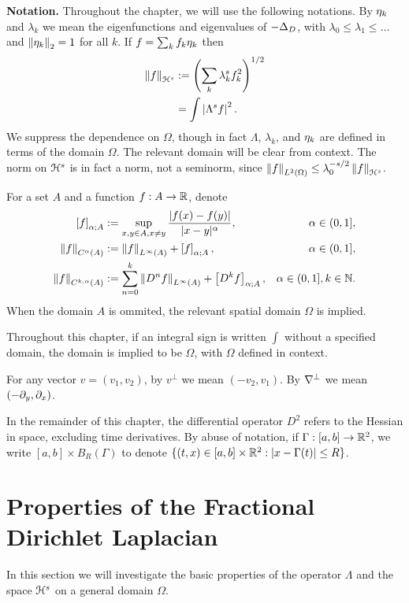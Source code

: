 \textbf{Notation.} Throughout the chapter, we will use the following notations.
By $\eta_{k}$ and $\lambda_k$ we mean the eigenfunctions and eigenvalues of $-\Delta_D$, with $\lambda_0 \leq \lambda_1 \leq \ldots$ and $\left\lVert\eta_{k}\right\rVert_2 = 1$ for all $k$.  
If $f = \sum_k f_k \eta_{k}$ then
\begin{align*} 
\left\lVert f\right\rVert_{\mathcal{H}^s} &:= \left( \sum_k \lambda_k^{s} f_k^2 \right)^{1/2} 
\\ &= \int \left\lvert \Lambda^{s} f \right\rvert^2. 
\end{align*}
We suppress the dependence on $\Omega$, though in fact $\Lambda$, $\lambda_k$, and $\eta_{k}$ are defined in terms of the domain $\Omega$.  The relevant domain will be clear from context.  The norm on $\mathcal{H}^s$ is in fact a norm, not a seminorm, since $\left\lVert f\right\rVert_{L^2(\Omega)} \leq \lambda_0^{-s/2} \left\lVert f\right\rVert_{\mathcal{H}^s}$.  

For a set $A$ and a function $f:A \to \mathbb{R}$, denote
\begin{align*}
\left[ f \right]_{\alpha;A} &:= \sup_{x,y \in A, x \neq y} \frac{|f(x)-f(y)|}{|x-y|^\alpha},  &\alpha \in (0,1], \\
\left\lVert f\right\rVert_{C^\alpha(A)} &:= \left\lVert f\right\rVert_{L^\infty(A)} + \left[ f \right]_{\alpha;A}, & \alpha \in (0,1], \\
\left\lVert f\right\rVert_{C^{k,\alpha}(A)} &:= \sum_{n=0}^k \left\lVert D^n f\right\rVert_{L^\infty(A)} + \left[ D^k f \right]_{\alpha;A}, & \alpha \in (0,1], k \in \mathbb{N}.
\end{align*}
When the domain $A$ is ommited, the relevant spatial domain $\Omega$ is implied.   

Throughout this chapter, if an integral sign is written $\int$ without a specified domain, the domain is implied to be $\Omega$, with $\Omega$ defined in context.  

For any vector $v = (v_1,v_2)$, by $v^\perp$ we mean $(-v_2,v_1)$. By $\nabla^\perp$ we mean $(-\partial_y, \partial_x)$.  

In the remainder of this chapter, the differential operator $D^2$ refers to the Hessian in space, excluding time derivatives.  By abuse of notation, if $\Gamma: [a,b] \to \mathbb{R}^2$, we write $[a,b] \times B_R(\Gamma)$ to denote $\{(t,x) \in [a,b]\times\mathbb{R}^2: |x-\Gamma(t)| \leq R\}$.  


\vskip1cm
\section{Properties of the Fractional Dirichlet Laplacian} \label{sec:lambda}

In this section we will investigate the basic properties of the operator $\Lambda$ and the space $\mathcal{H}^s$ on a general domain $\Omega$.  

